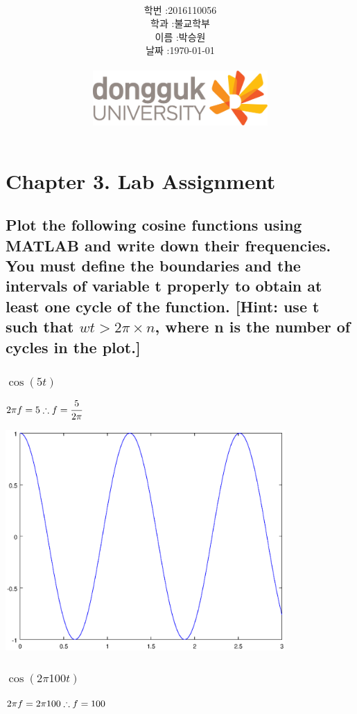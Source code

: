 \documentclass[12pt,a4paper]{article}
\title{
	\centering
	\pgfornament[width=12cm,color=teal]{84}\\
	\vspace{1cm}
	\fontsize{50}{50} \selectfont {정보통신 수학 및 실습\\Lab assignment}\\
		\pgfornament[width=12cm,color=teal]{88}\\
	\vfill}
\author{
	\LARGE
	\begin{tabular}{rl}
		\hline
		학번 : & 2016110056\\ 
		학과 : & 불교학부 \\
		이름 : & 박승원\\
		날짜 : & \today\\
		\hline
	\end{tabular}\vspace{1cm}
	\\
\includegraphics[width=0.5\textwidth]{logo.jpg}
	}
\date{}
\begin{document}
\maketitle
{}
\noindent
\lstset{language=matlab, columns=flexible, tabsize=4, frame=shadowbox, showstringspaces=false, breaklines=true, upquote=true, basicstyle=\normalsize}

\renewcommand{\thesubsubsection}{\alph{subsubsection})}
\renewcommand{\thesubsection}{\arabic{subsection}.}
\newpage
\section*{Chapter 3. Lab Assignment}
\subsection{Plot the following cosine functions using MATLAB and write down their frequencies.  You must define the boundaries and the intervals of variable t properly to obtain at least one cycle of the function.  [Hint: use t such that $wt > 2\pi\times n$, where n is the number of cycles in the plot.]} 

\subsubsection{$\cos(5t)$}
$2\pi f = 5\\
\therefore f = \dfrac{5}{2\pi}$

\includegraphics[width=0.8\textwidth]{a.eps}

\subsubsection{$\cos(2\pi 100t)$}
$2\pi f = 2\pi 100\\
\therefore f = 100$
\end{document}
